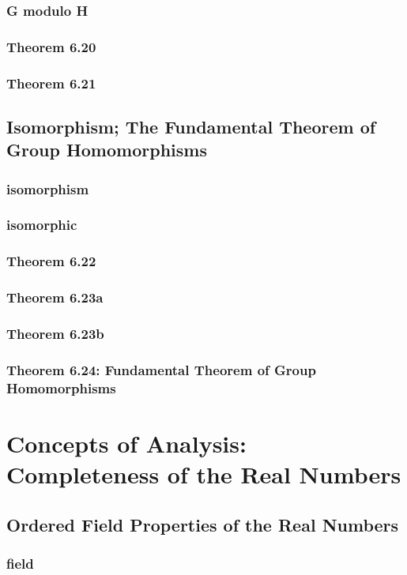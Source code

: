 \documentclass[a4paper]{article}
\begin{document}
\subsubsection*{G modulo H}
\subsubsection*{Theorem 6.20}
\subsubsection*{Theorem 6.21}
\subsection{Isomorphism; The Fundamental Theorem of Group Homomorphisms}   %
\subsubsection*{isomorphism}
\subsubsection*{isomorphic}
\subsubsection*{Theorem 6.22}
\subsubsection*{Theorem 6.23a}
\subsubsection*{Theorem 6.23b}
\subsubsection*{Theorem 6.24: Fundamental Theorem of Group Homomorphisms}

\newpage
\section{Concepts of Analysis: Completeness of the Real Numbers}   %
\subsection{Ordered Field Properties of the Real Numbers}   %
\subsubsection*{field}
\end{document}
